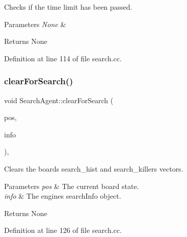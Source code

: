 Checks if the time limit has been passed. 


\begin{DoxyParams}{Parameters}
{\em None} & \\
\hline
\end{DoxyParams}
\begin{DoxyReturn}{Returns}
None 
\end{DoxyReturn}


Definition at line 114 of file search.\+cc.

\mbox{\label{classSearchAgent_a5f8153e871a9030a537684323668a1cd}} 
\subsubsection{\texorpdfstring{clear\+For\+Search()}{clearForSearch()}}
{\footnotesize\ttfamily void Search\+Agent\+::clear\+For\+Search (\begin{DoxyParamCaption}\item[{\mbox{\hyperlink{classBoard}{Board}} \&}]{pos,  }\item[{\mbox{\hyperlink{structSearchInfo}{Search\+Info}} \&}]{info }\end{DoxyParamCaption})\hspace{0.3cm}{\ttfamily [private]}, {\ttfamily [noexcept]}}



Clears the board\textquotesingle{}s search\+\_\+hist and search\+\_\+killers vectors. 


\begin{DoxyParams}{Parameters}
{\em pos} & The current board state. \\
\hline
{\em info} & The engine\textquotesingle{}s search\+Info object. \\
\hline
\end{DoxyParams}
\begin{DoxyReturn}{Returns}
None 
\end{DoxyReturn}


Definition at line 126 of file search.\+cc.

\mbox{\label{classSearchAgent_a93b96a89b905ff786e520b23481ed0d7}} 
